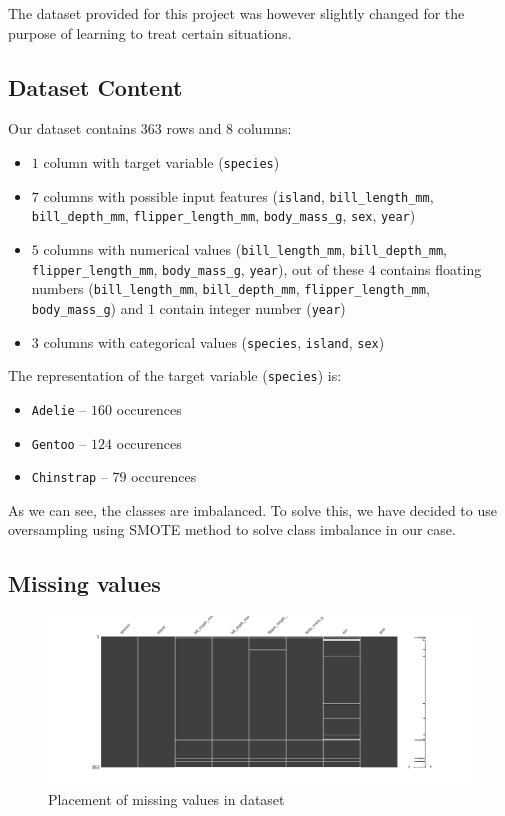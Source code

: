 \documentclass[12pt,a4paper]{article}
\begin{document}
\noindent
The dataset provided for this project was however slightly changed for the purpose of learning to treat certain situations. 

\subsection{Dataset Content}

Our dataset contains $363$ rows and $8$ columns:

\begin{itemize}
\item $1$ column with target variable (\texttt{species})
\item $7$ columns with possible input features (\texttt{island}, \texttt{bill\_length\_mm}, \texttt{bill\_depth\_mm}, \texttt{flipper\_length\_mm}, \texttt{body\_mass\_g}, \texttt{sex}, \texttt{year})
\item $5$ columns with numerical values (\texttt{bill\_length\_mm}, \texttt{bill\_depth\_mm}, \texttt{flipper\_length\_mm}, \texttt{body\_mass\_g}, \texttt{year}), out of these $4$ contains floating numbers (\texttt{bill\_length\_mm}, \texttt{bill\_depth\_mm}, \texttt{flipper\_length\_mm}, \texttt{body\_mass\_g}) and $1$ contain integer number (\texttt{year})
\item $3$ columns with categorical values (\texttt{species}, \texttt{island}, \texttt{sex})
\end{itemize}

The representation of the target variable (\texttt{species}) is:

\begin{itemize}
\item \texttt{Adelie} -- $160$ occurences
\item \texttt{Gentoo} -- $124$ occurences
\item \texttt{Chinstrap} -- $79$ occurences
\end{itemize}

As we can see, the classes are imbalanced. To solve this, we have decided to use oversampling using SMOTE method to solve class imbalance in our case.

\subsection{Missing values}

\begin{figure}[h]
	\centering
	\includegraphics[width=1.0\linewidth]{fig_missing_values}
	\caption{Placement of missing values in dataset}
	\label{fig:figmissingvalues}
\end{figure}
\end{document}
